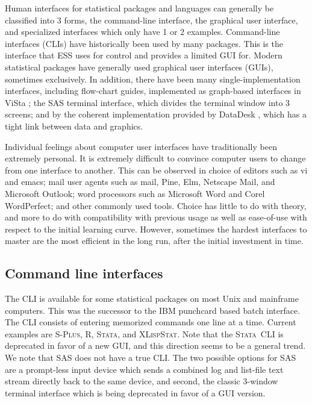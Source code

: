 \documentclass{article}
\newcommand*{\Splus}{\textsc{S-Plus}}
\newcommand*{\XLispStat}{\textsc{XLispStat}}
\newcommand*{\Stata}{\textsc{Stata}}
\begin{document}
Human interfaces for statistical packages and languages can generally
be classified into 3 forms, the command-line interface, the graphical
user interface, and specialized interfaces which only have 1 or 2
examples.  Command-line interfaces (CLIs) have historically been used
by many packages.  This is the interface that ESS uses for control and
provides a limited GUI for.  Modern statistical packages have
generally used graphical user interfaces (GUIs), sometimes
exclusively.  In addition, there have been many single-implementation
interfaces, including flow-chart guides, implemented as graph-based
interfaces in ViSta \citep{youn:lubi:1995}; the SAS terminal
interface, which divides the terminal window into 3 screens; and by
the coherent implementation provided by DataDesk
\citep{vell:prat:1989}, which has a tight link between data and
graphics.

Individual feelings about computer user interfaces have traditionally
been extremely personal.  It is extremely difficult to convince
computer users to change from one interface to another.  This can be
observed in choice of editors such as vi and emacs; mail user agents
such as mail, Pine, Elm, Netscape Mail, and Microsoft Outlook; word
processors such as Microsoft Word and Corel WordPerfect; and other
commonly used tools.  Choice has little to do with theory, and more to
do with compatibility with previous usage as well as ease-of-use with
respect to the initial learning curve.  However, sometimes the hardest
interfaces to master are the most efficient in the long run, after the
initial investment in time.

\subsection{Command line interfaces}
\label{sec:UI:command}

The CLI is available for some statistical packages on most Unix and
mainframe computers.  This was the successor to the IBM punchcard
based batch interface.  The CLI consists of entering memorized
commands one line at a time.  Current examples
are \Splus, R, \Stata, and \XLispStat.  Note that
the \Stata\ CLI is deprecated in favor of a new GUI, and this
direction seems to be a general trend.  We note that SAS does not have
a true CLI.  The two possible options for SAS are a prompt-less input
device which sends a combined log and list-file text stream directly
back to the same device, and second, the classic 3-window %
terminal interface which is being deprecated in favor of a GUI
version.
\end{document}
